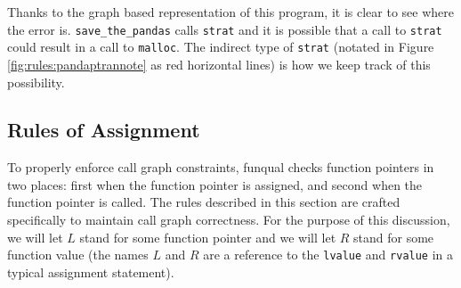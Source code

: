 Thanks to the graph based representation of this program, it is clear to see where the error is.  \lstinline{save_the_pandas} calls \lstinline{strat} and it is possible that a call to \lstinline{strat} could result in a call to \lstinline{malloc}.  The indirect type of \lstinline{strat} (notated in Figure \ref{fig:rules:pandaptrannote} as red horizontal lines) is how we keep track of this possibility.  

%
%
%

\subsection{Rules of Assignment}

To properly enforce call graph constraints, funqual checks function pointers in two places:  first when the function pointer is assigned, and second when the function pointer is called.  The rules described in this section are crafted specifically to maintain call graph correctness.  For the purpose of this discussion, we will let $L$ stand for some function pointer and we will let $R$ stand for some function value (the names $L$ and $R$ are a reference to the \lstinline{lvalue} and \lstinline{rvalue} in a typical assignment statement).  

